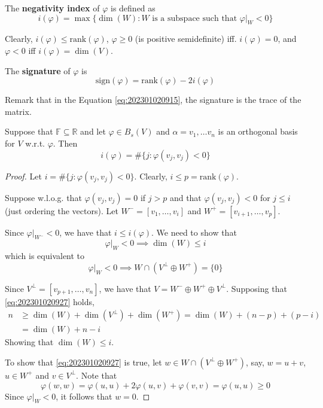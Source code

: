 \begin{definition}
  The \textbf{negativity index} of $\varphi$ is defined as 
  \[
    i(\varphi) = \max \{ \dim(W) : W \text{ is a subspace such that } \varphi|_W < 0 \}
  \]
\end{definition}

Clearly, $i(\varphi) \leq \text{rank}(\varphi)$, $\varphi \geq 0$ (is positive semidefinite) iff. $i(\varphi) = 0$, and $\varphi < 0$ iff $i(\varphi) = \dim(V)$. 

\begin{definition}[Signature]
  The \textbf{signature} of $\varphi$ is 
  \[
    \text{sign}(\varphi) = \text{rank}(\varphi) - 2 i(\varphi)
  \]
\end{definition}

Remark that in the Equation \ref{eq:202301020915}, the signature is the trace of the matrix. 

\begin{theorem}
  Suppose that $\mathbb{F} \subseteq \mathbb{R}$ and let $\varphi \in B_s(V)$ and $\alpha = v_1, \ldots v_n$ is an orthogonal basis for $V$ w.r.t. $\varphi$. Then 
  \[
    i(\varphi) = \# \{ j : \varphi(v_j, v_j) < 0 \}
  \]
\end{theorem}

\begin{proof}
  Let $i = \# \{ j : \varphi(v_j, v_j) < 0 \}$. Clearly, $i \leq p = \text{rank}(\varphi)$. 

  Suppose w.l.o.g. that $\varphi(v_j, v_j) = 0$ if $j > p$ and that $\varphi(v_j, v_j) < 0$ for $j \leq i$ (just ordering the vectors). Let $W^- = [v_1, \ldots, v_i]$ and $W^+ = [v_{i+1}, \ldots, v_p]$. 

  Since $\varphi|_{W^-} < 0$, we have that $i \leq i(\varphi)$. We need to show that 
  \[
    \varphi|_W < 0 \implies \dim(W) \leq i 
  \]
  which is equivalent to
  \begin{equation}\label{eq:202301020927}
    \varphi|_W < 0 \implies W \cap (V^\perp \oplus W^+) = \{ 0 \}
  \end{equation}

  Since $V^\perp = [v_{p+1}, \ldots, v_n]$, we have that $V = W^- \oplus W^+ \oplus V^\perp$. Supposing that \ref{eq:202301020927} holds, 
  \begin{equation*}
    \begin{aligned}
      n &\geq \dim(W) + \dim(V^\perp) + \dim(W^+) = \dim(W) + (n-p) + (p-i) \\
        &= \dim(W) + n - i
    \end{aligned}
    \label{eq:202301020928}
  \end{equation*}
  Showing that $\dim(W) \leq i$. 

  To show that \ref{eq:202301020927} is true, let $w \in W \cap (V^\perp \oplus W^+)$, say, $w = u+v$, $u \in W^+$ and $v \in V^\perp$. Note that 
  \[
    \varphi(w,w) = \varphi(u,u) + 2 \varphi(u, v) + \varphi(v,v) = \varphi(u,u) \geq 0
  \]
  Since $\varphi|_W < 0$, it follows that $w = 0$. 
\end{proof}


